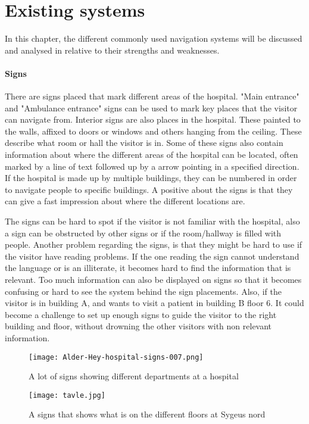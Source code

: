 \section{Existing systems} %
\label{sec:existing_systems}
In this chapter, the different commonly used navigation systems will be discussed and analysed in relative to their strengths and weaknesses.

\paragraph{Signs}
There are signs placed that mark different areas of the hospital. "Main entrance" and "Ambulance entrance" \cite{signs_hospital} signs can be used to mark key places that the visitor can navigate from\cite{art_Osborne}.
Interior signs are also places in the hospital. These painted to the walls, affixed to doors or windows\cite{signs_wall} and others hanging from the ceiling. These describe what room or hall the visitor is in. Some of these signs also contain information about where the different areas of the hospital can be located, often marked by a line of text followed up by a arrow pointing in a specified direction\cite{signs_hospital2}. If the hospital is made up by multiple buildings, they can be numbered in order to navigate people to specific buildings. 
A positive about the signs is that they can give a fast impression about where the different locations are.

The signs can be hard to spot if the  visitor is not familiar with the hospital, also a sign can be obstructed by other signs or if the room/hallway is filled with people. Another problem regarding the signs, is that they might be hard to use if the visitor have reading problems. If the one reading the sign cannot understand the language or is an illiterate, it becomes hard to find the information that is relevant\cite{signs_reading}. Too much information can also be displayed on signs so that it becomes confusing or hard to see the system behind the sign placements.
Also, if the visitor is in building A, and wants to visit a patient in building B floor 6. It could become a challenge to set up enough signs to guide the visitor to the right building and floor, without drowning the other visitors with non relevant information.

  \begin{figure}[ht!]
  \centering
  \texttt{[image: Alder-Hey-hospital-signs-007.png]}
  \caption{A lot of signs showing different departments at a hospital\cite{signs_hospital}}
  \label{overflow}
  \end{figure}
  \begin{figure}[ht!]
  \centering
  \texttt{[image: tavle.jpg]}
  \caption{A signs that shows what is on the different floors at Sygeus nord}
  \label{overflow}
  \end{figure}  
